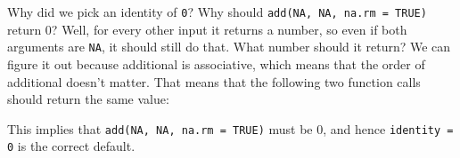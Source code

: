 \begin{Shaded}
\begin{Highlighting}[]
\StringTok{ } \NormalTok{) \{}
  \StringTok{ }\NormalTok{(}\StringTok{ }\StringTok{ }
\NormalTok{\}}
\NormalTok{(}\NormalTok{, }\NormalTok{)}
\NormalTok{(}\NormalTok{, }\NormalTok{, } \NormalTok{)}
\NormalTok{(}\NormalTok{, }\NormalTok{)}
\NormalTok{(}\NormalTok{, }\NormalTok{, } \NormalTok{)}
\end{Highlighting}
\end{Shaded}

Why did we pick an identity of \texttt{0}? Why should
\texttt{add(NA, NA, na.rm = TRUE)} return 0? Well, for every other input
it returns a number, so even if both arguments are \texttt{NA}, it
should still do that. What number should it return? We can figure it out
because additional is associative, which means that the order of
additional doesn't matter. That means that the following two function
calls should return the same value:

\begin{Shaded}
\begin{Highlighting}[]
\NormalTok{(}\NormalTok{(}\NormalTok{, }\NormalTok{, } \NormalTok{), }\NormalTok{, } \NormalTok{)}
\NormalTok{(}\NormalTok{, }\NormalTok{(}\NormalTok{, }\NormalTok{, } \NormalTok{), } \NormalTok{)}
\end{Highlighting}
\end{Shaded}

This implies that \texttt{add(NA, NA, na.rm = TRUE)} must be 0, and
hence \texttt{identity = 0} is the correct default.

